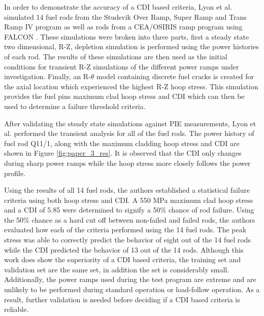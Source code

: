 \documentclass[edeposit,fullpage,11pt]{uiucthesis2009}
\begin{document}
In order to demonstrate the accuracy of a \gls{CDI} based criteria, Lyon et al. simulated 14 fuel rods from the Studsvik Over Ramp, Super Ramp and Trans Ramp IV program as well as rods from a CEA/OSIRIS ramp program using FALCON \cite{killeen_experimental_2004}. 
These simulations were broken into three parts, first a steady state two dimensional, R-Z, depletion simulation is performed using the power histories of each rod.
The results of these simulations are then used as the initial conditions for transient R-Z simulations of the different power ramps under investigation.
Finally, an R-$\theta$ model containing discrete fuel cracks is created for the axial location which experienced the highest R-Z hoop stress.
This simulation provides the fuel pins maximum clad hoop stress and \gls{CDI} which can then be used to determine a failure threshold criteria.

After validating the steady state simulations against \gls{PIE} measurements, Lyon et al. performed the transient analysis for all of the fuel rods. 
The power history of fuel rod Q11/1, along with the maximum cladding hoop stress and \gls{CDI} are shown in Figure \ref{fig:paper_3_res}.
It is observed that the \gls{CDI} only changes during sharp power ramps while the hoop stress more closely follows the power profile.

Using the results of all 14 fuel rods, the authors established a statistical failure criteria using both hoop stress and \gls{CDI}.
A 550 MPa maximum clad hoop stress  and a \gls{CDI} of 5.85 were determined to signify a 50\% chance of rod failure.
Using the 50\% chance as a hard cut off between non-failed and failed rods, the authors evaluated how each of the criteria performed using the 14 fuel rods.
The peak stress was able to correctly predict the behavior of eight out of the 14 fuel rods while the \gls{CDI} predicted the behavior of 13 out of the 14 rods.
Although this work does show the superiority of a \gls{CDI} based criteria, the training set and validation set are the same set, in addition the set is considerably small.
Additionally, the power ramps used during the test program are extreme and are unlikely to be performed during standard operation or load-follow operation.
As a result, further validation is needed before deciding if a \gls{CDI} based criteria is reliable.
 
\end{document}

